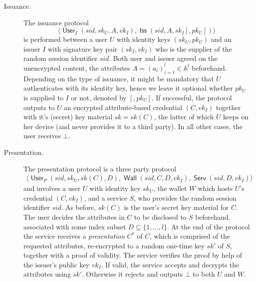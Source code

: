 \documentclass[runningheads]{llncs}
\DeclareMathOperator{\issuer}{\mathsf{Iss}}
\DeclareMathOperator{\user}{\mathsf{User}}
\DeclareMathOperator{\wallet}{\mathsf{Wall}}
\DeclareMathOperator{\service}{\mathsf{Serv}}
\begin{document}
\begin{description}
\item[Issuance.]
The issuance protocol
\[
\big\langle\user_I\left(sid, sk_U, A, vk_I\right), \issuer\left(sid,  A, sk_I [, pk_U]\right)\big\rangle
\]
is performed between a user $U$ with identity keys $(sk_U,pk_U)$ and an issuer $I$ with signature key pair $(sk_I,vk_I)$ who is the supplier of the random session identifier $sid$.
Both user and issuer agreed on the unencrypted content, the attributes $A=(a_i)_{i=1}^l\in \mathbb A^l$ beforehand.
Depending on the type of issuance, it might be mandatory that $U$ authenticates with its identity key, hence we leave it optional whether $pk_U$ is supplied to $I$ or not, denoted by $[, pk_U]$.
If successful, the protocol outputs to $U$ an encrypted attribute-based credential $(C,vk_I)$ together with it's (secret) key material $sk=sk(C)$, the latter of which $U$ keeps on her device (and  never provides it to a third party).
In all other cases, the user receives $\bot$.

\item[Presentation.]
The presentation protocol  is a three party protocol
\begin{multline*}
\Big\langle\user_P\left(sid, sk_U,sk(C) , D\right), 
\wallet\left(sid, C,D, vk_I\right), \service\left(sid, D, vk_I\right)\Big\rangle
\end{multline*}
and involves a user $U$ with identity key $sk_U$, the wallet $W$ which hosts $U$'s credential $(C,vk_I)$, and a service $S$, who provides the random session identifier $sid$.
As before, $sk(C)$ is the user's secret key material for $C$.
The user decides the attributes in $C$ to be disclosed to $S$ beforehand, associated with some index subset $D\subseteq\{1,\ldots,l\}$.
At the end of the protocol the service receives a \emph{presentation} $C^*$ of $C$, which is comprised of the requested attributes, re-encrypted to a random one-time key $sk'$ of $S$, together with a proof of validity.
The service verifies the proof by help of the issuer's public key $vk_I$. 
If valid, the service accepts and decrypts the attributes using $sk'$.
Otherwise it rejects and outputs $\bot$ to both $U$ and $W$.
\end{description}
\end{document}
